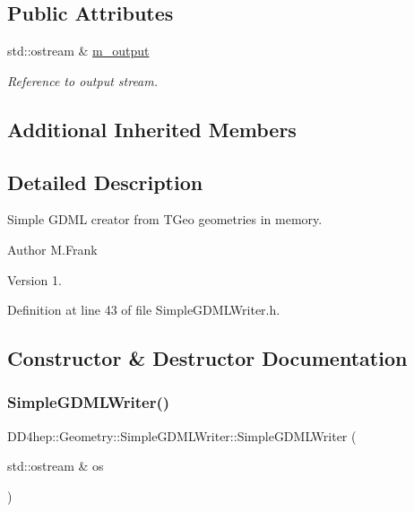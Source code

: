 \subsection*{Public Attributes}
\begin{DoxyCompactItemize}
\item 
std\+::ostream \& \hyperlink{class_d_d4hep_1_1_geometry_1_1_simple_g_d_m_l_writer_acfe610e807da01fe85b3e2bf5f94f428}{m\+\_\+output}
\begin{DoxyCompactList}\small\item\em Reference to output stream. \end{DoxyCompactList}\end{DoxyCompactItemize}
\subsection*{Additional Inherited Members}


\subsection{Detailed Description}
Simple G\+D\+ML creator from T\+Geo geometries in memory. 

\begin{DoxyAuthor}{Author}
M.\+Frank 
\end{DoxyAuthor}
\begin{DoxyVersion}{Version}
1. 
\end{DoxyVersion}


Definition at line 43 of file Simple\+G\+D\+M\+L\+Writer.\+h.



\subsection{Constructor \& Destructor Documentation}
\hypertarget{class_d_d4hep_1_1_geometry_1_1_simple_g_d_m_l_writer_a15eda8337c0e6b902ca91bd3cf5dd9a0}{}\label{class_d_d4hep_1_1_geometry_1_1_simple_g_d_m_l_writer_a15eda8337c0e6b902ca91bd3cf5dd9a0} 
\subsubsection{\texorpdfstring{Simple\+G\+D\+M\+L\+Writer()}{SimpleGDMLWriter()}}
{\footnotesize\ttfamily D\+D4hep\+::\+Geometry\+::\+Simple\+G\+D\+M\+L\+Writer\+::\+Simple\+G\+D\+M\+L\+Writer (\begin{DoxyParamCaption}\item[{std\+::ostream \&}]{os }\end{DoxyParamCaption})\hspace{0.3cm}{\ttfamily [inline]}}



